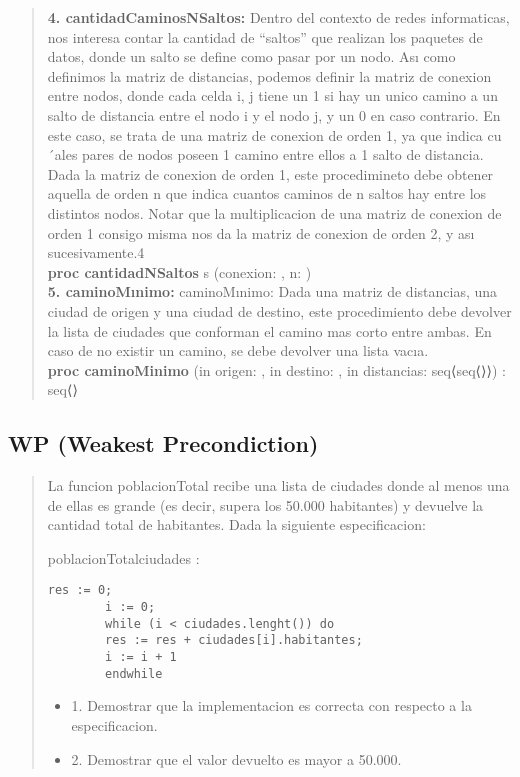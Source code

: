 \documentclass[10pt,a4paper]{article}
\begin{document}
\begin{quote}
\textbf{4. cantidadCaminosNSaltos:} Dentro del contexto de redes informaticas, nos interesa contar la cantidad de “saltos”
que realizan los paquetes de datos, donde un salto se define como pasar por un nodo.
Ası como definimos la matriz de distancias, podemos definir la matriz de conexion entre nodos, donde cada celda i, j
tiene un 1 si hay un unico camino a un salto de distancia entre el nodo i y el nodo j, y un 0 en caso contrario. En este
caso, se trata de una matriz de conexion de orden 1, ya que indica cu´ales pares de nodos poseen 1 camino entre ellos a
1 salto de distancia.
Dada la matriz de conexion de orden 1, este procedimineto debe obtener aquella de orden n que indica cuantos caminos
de n saltos hay entre los distintos nodos. Notar que la multiplicacion de una matriz de conexion de orden 1 consigo
misma nos da la matriz de conexion de orden 2, y ası sucesivamente.4
\\
\vspace{0.2cm}
\textbf{proc cantidadNSaltos } s (\Inout conexion: \matriz{\ent}, \In n: \ent)
\vspace{0.2cm}
\\
\vspace{0.2cm}
\textbf{5. caminoMınimo:} caminoMınimo: Dada una matriz de distancias, una ciudad de origen y una ciudad de destino, este procedimiento
debe devolver la lista de ciudades que conforman el camino mas corto entre ambas. En caso de no existir un camino,
se debe devolver una lista vacıa.
\\
\textbf{proc caminoMinimo} (in origen: \ent, in destino: \ent, in distancias: seq⟨seq⟨\ent⟩⟩) : seq⟨\ent⟩
\end {quote}
\subsection{WP (Weakest Precondiction)}
\begin{quote}
	La funcion poblacionTotal recibe una lista de ciudades donde al menos una de ellas es grande (es decir, supera los
	50.000 habitantes) y devuelve la cantidad total de habitantes. Dada la siguiente especificacion:
	\begin{proc}{poblacionTotal}{\In ciudades : }{\ent}
	\end{proc}
	\begin{lstlisting}[caption={},label=code:for]
		res := 0;
		i := 0;
		while (i < ciudades.lenght()) do
		res := res + ciudades[i].habitantes;
		i := i + 1
		endwhile
	\end{lstlisting}
	\begin{itemize}
		\item1. Demostrar que la implementacion es correcta con respecto a la especificacion.
		\item2. Demostrar que el valor devuelto es mayor a 50.000.
	\end{itemize}
\end{quote}
\end{document}
